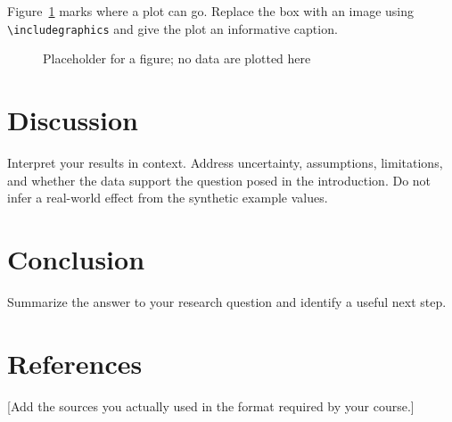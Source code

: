 \documentclass[11pt]{article}
\begin{document}
Figure~\ref{fig:placeholder} marks where a plot can go. Replace the box with an image using \verb|\includegraphics| and give the plot an informative caption.

\begin{figure}[htbp]
  \centering
  \caption{Placeholder for a figure; no data are plotted here}
  \label{fig:placeholder}
\end{figure}

\section{Discussion}
Interpret your results in context. Address uncertainty, assumptions, limitations, and whether the data support the question posed in the introduction. Do not infer a real-world effect from the synthetic example values.

\section{Conclusion}
Summarize the answer to your research question and identify a useful next step.

\section*{References}
[Add the sources you actually used in the format required by your course.]
\end{document}
